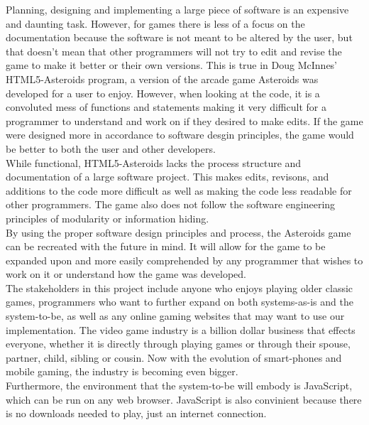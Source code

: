 \documentclass{article}
\begin{document}
Planning, designing and implementing a large piece of software is an expensive and
daunting task. However, for games there is less of a focus on the documentation because the
software is not meant to be altered by the user, but that doesn't mean that other programmers
will not try to edit and revise the game to make it better or their own versions.
This is true in Doug McInnes' HTML5-Asteroids program, a version of the arcade game Asteroids
was developed for a user to enjoy. However, when looking at the code, it is a convoluted mess of
functions and statements making it very difficult for a programmer to understand and work on
if they desired to make edits. If the game were designed more in accordance to software desgin
principles, the game would be better to both the user and other developers.\\
While functional, HTML5-Asteroids lacks the process structure and
documentation of a large software project. This makes edits, revisons, and additions to the
code more difficult as well as making the code less readable for other programmers. The game
also does not follow the software engineering principles of modularity or information hiding.\\
By using the proper software design principles and process, the Asteroids game can
be recreated with the future in mind. It will allow for the game to be expanded upon and more
easily comprehended by any programmer that wishes to work on it or understand how the game was
developed.\\
The stakeholders in this project include anyone who enjoys playing older classic games, programmers
who want to further expand on both systems-as-is and the system-to-be, as well as any online gaming
websites that may want to use our implementation.
The video game industry is a billion dollar business that effects everyone, whether it is directly
through playing games or through their spouse, partner, child, sibling or cousin. Now with the
evolution of smart-phones and mobile gaming, the industry is becoming even bigger.\\
Furthermore, the environment that the system-to-be will embody is JavaScript, which can be run on
any web browser. JavaScript is also convinient because there is no downloads needed to play,
just an internet connection.





\end{document}
